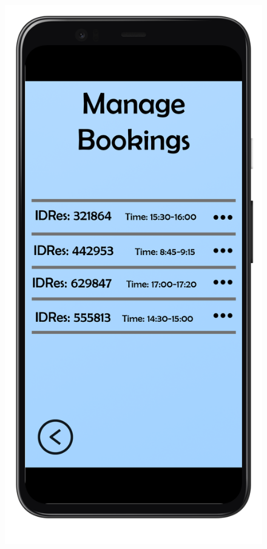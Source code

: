 \documentclass{article}
\begin{document}
		\begin{figure}[!h]
			\centering
			\begin{minipage}[!h]{0.4\textwidth}
				\includegraphics[width=\textwidth]{../Mockups/ManageBookings.png}

\end{minipage}
\end{figure}
\end{document}
